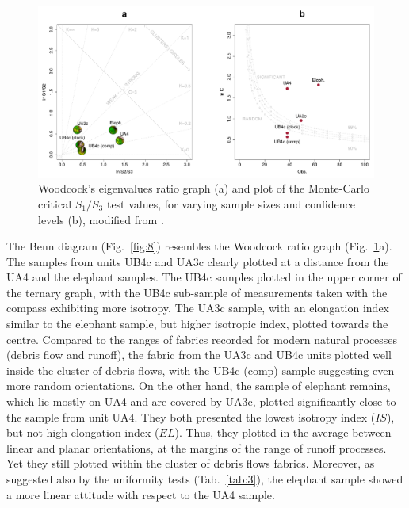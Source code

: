 \documentclass[preprint,authoryear,times]{elsarticle} %
\begin{document}
\begin{figure}[]
  \centering
  \includegraphics[width=1\textwidth]{./artwork/Fig7.pdf}
  \caption{Woodcock's eigenvalues ratio graph (a) and plot of the Monte-Carlo critical $S_1/S_3$ test values, for varying sample sizes and confidence levels (b), modified from \cite{Woodcock1983}.}
  \label{fig:7}
\end{figure}

The Benn diagram (Fig.~\ref{fig:8}) resembles the Woodcock ratio graph (Fig.~\ref{fig:7}a). The samples from units UB4c and UA3c clearly plotted at a distance from the UA4 and the elephant samples. The UB4c samples plotted in the upper corner of the ternary graph, with the UB4c sub-sample of measurements taken with the compass exhibiting more isotropy. The UA3c sample, with an elongation index similar to the elephant sample, but higher isotropic index, plotted towards the centre. Compared to the ranges of fabrics recorded for modern natural processes (debris flow and runoff), the fabric from the UA3c and UB4c units plotted well inside the cluster of debris flows, with the UB4c (comp) sample suggesting even more random orientations. On the other hand, the sample of elephant remains, which lie mostly on UA4 and are covered by UA3c, plotted significantly close to the sample from unit UA4. They both presented the lowest isotropy index ($IS$), but not high elongation index ($EL$). Thus, they plotted in the average between linear and planar orientations, at the margins of the range of runoff processes. Yet they still plotted within the cluster of debris flows fabrics. Moreover, as suggested also by the uniformity tests (Tab.~\ref{tab:3}), the elephant sample showed a more linear attitude with respect to the UA4 sample.
\end{document}
